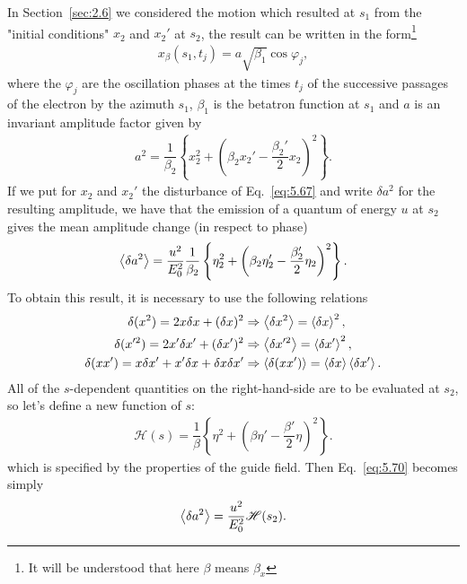 In Section~\ref{sec:2.6} we considered the motion which resulted at $s_1$ from the "initial
conditions" $x_2$ and $x_2'$ at $s_2$, the result can be written in the form\footnote{It will be understood that here $\beta$ means $\beta_x$}
\begin{align} \label{eq:5.68}
	x_\beta(s_1,t_j) = a \sqrt{\beta_1} \cos \varphi_j,
\end{align}
where the $\varphi_j$ are the oscillation phases at the times $t_j$ of the successive passages
of the electron by the azimuth $s_1$, $\beta_1$ is the betatron function at $s_1$ and $a$ is an
invariant amplitude factor given by
\begin{align}
	a^2 = \dfrac{1}{\beta_2} \left\lbrace x_2^2 + \left( \beta_2 x_2' - \dfrac{\beta_2'}{2} x_2 \right)^2 \right\rbrace.
\end{align}
If we put for $x_2$ and $x_2'$ the disturbance of Eq.~\eqref{eq:5.67} and write $\delta a^2$ for the resulting amplitude, we have that the emission of a quantum of energy $u$ at $s_2$ gives the
mean amplitude change (in respect to phase)
\begin{align} \label{eq:5.70}
	\left< \delta a^2 \right> = \dfrac{u^2}{E_0^2} \dfrac{1}{\beta_2} \left\lbrace \eta_2^2 + \left( \beta_2 \eta_2' - \dfrac{\beta_2'}{2} \eta_2 \right)^2 \right\rbrace.
\end{align}
To obtain this result, it is necessary to use the following relations
\begin{align*}
	\delta(x^2) = 2 x \delta x + (\delta x)^2 & \Rightarrow \left< \delta x^2 \right> = \left< \delta x \right>^2,\\
    \delta(x'^2) = 2 x' \delta x' + (\delta x')^2 & \Rightarrow \left< \delta x'^2 \right> = \left< \delta x' \right>^2,\\
    \delta(x x') = x \delta x' + x' \delta x + \delta x \delta x' & \Rightarrow \left< \delta (x x') \right> = \left< \delta x \right> \left< \delta x' \right>.
\end{align*}
All of the $s$-dependent quantities on the right-hand-side are to be evaluated at $s_2$, so let's define a new function of $s$:
\begin{align} \label{eq:5.71}
	\mathscr{H}(s) = \dfrac{1}{\beta} \left\lbrace \eta^2 + \left( \beta \eta' - \dfrac{\beta'}{2} \eta \right)^2 \right\rbrace.
\end{align}
which is specified by the properties of the guide field. Then Eq.~\eqref{eq:5.70} becomes
simply
\begin{align} \label{eq:5.73}
	\left< \delta a^2 \right> = \dfrac{u^2}{E_0^2} \mathscr{H}(s_2).
\end{align}
